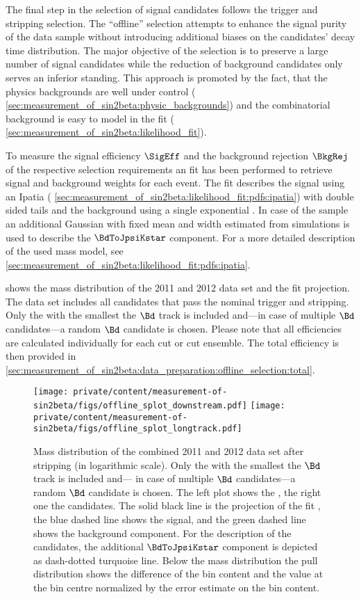 The final step in the selection of signal candidates follows the trigger and
stripping selection. The \enquote{offline} selection attempts to enhance the
signal purity of the data sample without introducing additional biases on the
\Bd candidates' decay time distribution. The major objective of the selection is
to preserve a large number of signal candidates while the reduction of
background candidates only serves an inferior standing. This approach is
promoted by the fact, that the physics backgrounds are well under control (\cf
\cref{sec:measurement_of_sin2beta:physic_backgrounds}) and the combinatorial
background is easy to model in the fit (\cf
\cref{sec:measurement_of_sin2beta:likelihood_fit}).

To measure the signal efficiency $\SigEff$ and the background rejection
$\BkgRej$ of the respective selection requirements an \sPlot fit
\cite{Pivk:2004ty} has been performed to retrieve signal and background weights
for each event. The fit describes the signal using an Ipatia \PDF (\cf
\cref{sec:measurement_of_sin2beta:likelihood_fit:pdfs:ipatia}) with double sided
tails and the background using a single exponential \PDF. In case of the \catLL
sample an additional Gaussian \PDF with fixed mean and width estimated from \MC
simulations is used to describe the $\BdToJpsiKstar$ component. For a more
detailed description of the used mass model, see
\cref{sec:measurement_of_sin2beta:likelihood_fit:pdfs:ipatia}.

 shows the mass
distribution of the 2011 and 2012 data set and the fit projection. The data set
includes  all candidates that pass the nominal trigger and stripping. Only the
\PV with the smallest \IP \chisqndf \wrt the $\Bd$ track is included and---in
case of multiple $\Bd$ candidates---a random $\Bd$ candidate is chosen. Please
note that all efficiencies are calculated individually for each cut or cut
ensemble. The total efficiency is then provided in
\cref{sec:measurement_of_sin2beta:data_preparation:offline_selection:total}.
%
\begin{figure}
\texttt{[image: private/content/measurement-of-sin2beta/figs/offline\_splot\_downstream.pdf]}
\texttt{[image: private/content/measurement-of-sin2beta/figs/offline\_splot\_longtrack.pdf]}
\label{fig:measurement_of_sin2beta:data_preparation:offline_selection:before}
\caption{Mass distribution of the combined 2011 and 2012 data set after
stripping (in logarithmic scale). Only the \PV with the smallest \IP \chisqndf
\wrt the $\Bd$ track is included and--- in case of multiple $\Bd$ candidates---a
random $\Bd$ candidate is chosen. The left plot shows the \catDD, the right one
the \catLL candidates. The solid black line is the projection of the fit \PDF,
the blue dashed line shows the signal, and the green dashed line shows the
background component. For the description of the \catLL candidates, the
additional $\BdToJpsiKstar$ component is depicted as dash-dotted turquoise line.
Below the mass distribution the pull distribution shows the difference of the
bin content and the \PDF value at the bin centre normalized by the error
estimate on the bin content.}
\end{figure}

